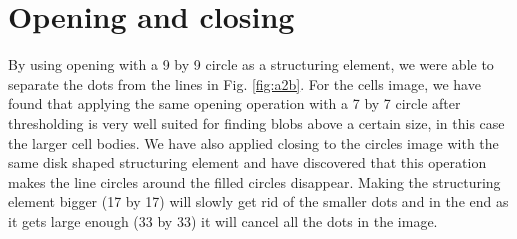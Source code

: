 \documentclass[11pt,a4paper]{article}
\begin{document}
\section{Opening and closing}
By using opening with a 9 by 9 circle as a structuring element, we were able to separate the dots from the lines in Fig. \ref{fig:a2b}. For the cells image, we have found that applying the same opening operation with a 7 by 7 circle after thresholding is very well suited for finding blobs above a certain size, in this case the larger cell bodies. We have also applied closing to the circles image with the same disk shaped structuring element and have discovered that this operation makes the line circles around the filled circles disappear.
Making the structuring element bigger (17 by 17) will slowly get rid of the smaller dots and in the end as it gets large enough (33 by 33) it will cancel all the dots in the image.
\end{document}
